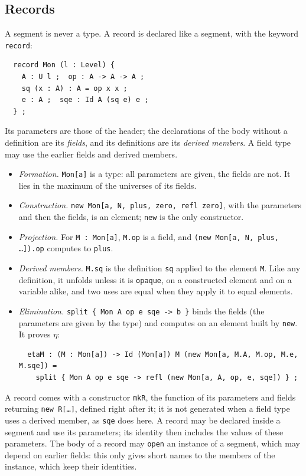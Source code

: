 \documentclass[11pt]{article}
\newcommand{\kw}[1]{\texttt{#1}}
\theoremstyle{remark}
\begin{document}
\subsection{Records}\label{sec:segtypes}

A segment is never a type. A record is declared like a segment, with the
keyword \kw{record}:
\begin{verbatim}
  record Mon (l : Level) {
    A : U l ;  op : A -> A -> A ;
    sq (x : A) : A = op x x ;
    e : A ;  sqe : Id A (sq e) e ;
  } ;
\end{verbatim}
Its parameters are those of the header; the declarations of the body
without a definition are its \emph{fields}, and its definitions are its
\emph{derived members}. A field type may use the earlier fields and
derived members.
\begin{itemize}
\item \emph{Formation.} \kw{Mon[a]} is a type: all parameters are given,
  the fields are not. It lies in the maximum of the universes of its
  fields.
\item \emph{Construction.} \kw{new Mon[a, N, plus, zero, refl zero]}, with
  the parameters and then the fields, is an element; \kw{new} is the only
  constructor.
\item \emph{Projection.} For \kw{M : Mon[a]}, \kw{M.op} is a field, and
  \kw{(new Mon[a, N, plus, \dots]).op} computes to \kw{plus}.
\item \emph{Derived members.} \kw{M.sq} is the definition \kw{sq} applied
  to the element \kw{M}. Like any definition, it unfolds unless it is
  \kw{opaque}, on a constructed element and on a variable alike, and two
  uses are equal when they apply it to equal elements.
\item \emph{Elimination.} \kw{split \{ Mon A op e sqe -> b \}} binds the
  fields (the parameters are given by the type) and computes on an element
  built by \kw{new}. It proves $\eta$:
\begin{verbatim}
  etaM : (M : Mon[a]) -> Id (Mon[a]) M (new Mon[a, M.A, M.op, M.e, M.sqe]) =
    split { Mon A op e sqe -> refl (new Mon[a, A, op, e, sqe]) } ;
\end{verbatim}
\end{itemize}
A record comes with a constructor \kw{mkR}, the function of its
parameters and fields returning \kw{new R[\dots]}, defined right after it;
it is not generated when a field type uses a derived member, as \kw{sqe}
does here. A record may be declared inside a segment and use
its parameters; its identity then includes the values of these
parameters. The body of a record may \kw{open} an instance of a segment,
which may depend on earlier fields: this only gives short names to the
members of the instance, which keep their identities.
\end{document}
